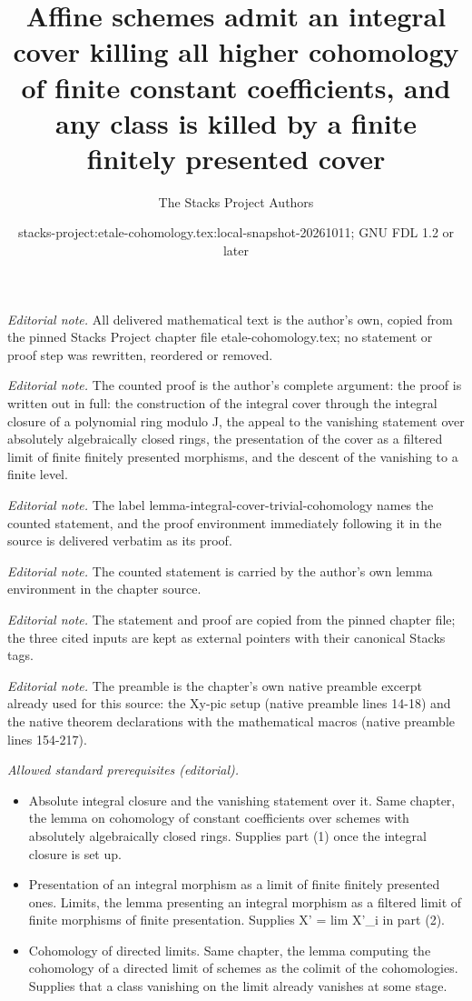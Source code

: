 \documentclass[10pt,a4paper]{amsart}
\title{Affine schemes admit an integral cover killing all higher cohomology of finite constant coefficients, and any class is killed by a finite finitely presented cover}
\author{The Stacks Project Authors}
\date{stacks-project:etale-cohomology.tex:local-snapshot-20261011; GNU FDL 1.2 or later}
\theoremstyle{plain}
\theoremstyle{definition}
\theoremstyle{remark}
\numberwithin{equation}{subsection}
\begin{document}
\maketitle
\noindent\textit{Editorial note.} All delivered mathematical text is the author's own, copied from the pinned Stacks Project chapter file etale-cohomology.tex; no statement or proof step was rewritten, reordered or removed.\par\medskip
\noindent\textit{Editorial note.} The counted proof is the author's complete argument: the proof is written out in full: the construction of the integral cover through the integral closure of a polynomial ring modulo J, the appeal to the vanishing statement over absolutely algebraically closed rings, the presentation of the cover as a filtered limit of finite finitely presented morphisms, and the descent of the vanishing to a finite level.\par\medskip
\noindent\textit{Editorial note.} The label lemma-integral-cover-trivial-cohomology names the counted statement, and the proof environment immediately following it in the source is delivered verbatim as its proof.\par\medskip
\noindent\textit{Editorial note.} The counted statement is carried by the author's own lemma environment in the chapter source.\par\medskip
\noindent\textit{Editorial note.} The statement and proof are copied from the pinned chapter file; the three cited inputs are kept as external pointers with their canonical Stacks tags.\par\medskip
\noindent\textit{Editorial note.} The preamble is the chapter's own native preamble excerpt already used for this source: the Xy-pic setup (native preamble lines 14-18) and the native theorem declarations with the mathematical macros (native preamble lines 154-217).\par\medskip
\noindent\textit{Allowed standard prerequisites (editorial).}\begin{itemize}
\item Absolute integral closure and the vanishing statement over it. Same chapter, the lemma on cohomology of constant coefficients over schemes with absolutely algebraically closed rings. Supplies part (1) once the integral closure is set up.
\item Presentation of an integral morphism as a limit of finite finitely presented ones. Limits, the lemma presenting an integral morphism as a filtered limit of finite morphisms of finite presentation. Supplies X' = lim X'\_i in part (2).
\item Cohomology of directed limits. Same chapter, the lemma computing the cohomology of a directed limit of schemes as the colimit of the cohomologies. Supplies that a class vanishing on the limit already vanishes at some stage.
\end{itemize}\medskip
\end{document}
